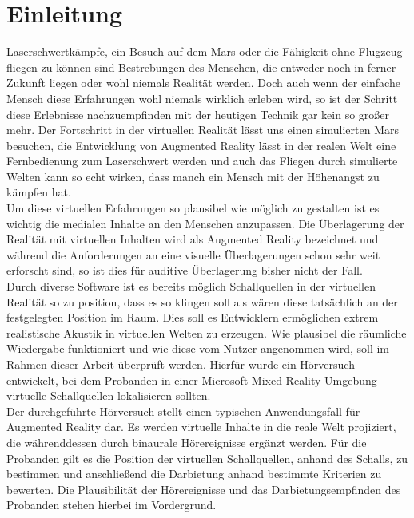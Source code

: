 \chapter{Einleitung}

Laserschwertkämpfe, ein Besuch auf dem Mars oder die Fähigkeit ohne Flugzeug fliegen zu können sind Bestrebungen des Menschen, die entweder noch in ferner Zukunft liegen oder wohl niemals Realität werden. Doch auch wenn der einfache Mensch diese Erfahrungen wohl niemals wirklich erleben wird, so ist der Schritt diese Erlebnisse nachzuempfinden mit der heutigen Technik gar kein so großer mehr. Der Fortschritt in der virtuellen Realität lässt uns einen simulierten Mars besuchen, die Entwicklung von Augmented Reality lässt in der realen Welt eine Fernbedienung zum Laserschwert werden und auch das Fliegen durch simulierte Welten kann so echt wirken, dass manch ein Mensch mit der Höhenangst zu kämpfen hat. \\

Um diese virtuellen Erfahrungen so plausibel wie möglich zu gestalten ist es wichtig die medialen Inhalte an den Menschen anzupassen. Die Überlagerung der Realität mit virtuellen Inhalten wird als Augmented Reality bezeichnet und während die Anforderungen an  eine visuelle Überlagerungen schon sehr weit erforscht sind, so ist dies für auditive Überlagerung bisher nicht der Fall. \\

Durch diverse Software ist es bereits möglich Schallquellen in der virtuellen Realität so zu position, dass es so klingen soll als wären diese tatsächlich an der festgelegten Position im Raum. Dies soll es Entwicklern ermöglichen extrem realistische Akustik in virtuellen Welten zu erzeugen. Wie plausibel die räumliche Wiedergabe funktioniert und wie diese vom Nutzer angenommen wird, soll im Rahmen dieser Arbeit überprüft werden. Hierfür wurde ein Hörversuch entwickelt, bei dem Probanden in einer Microsoft Mixed-Reality-Umgebung virtuelle Schallquellen lokalisieren sollten. \\

Der durchgeführte Hörversuch stellt einen typischen Anwendungsfall für Augmented Reality dar. Es werden virtuelle Inhalte in die reale Welt projiziert, die währenddessen durch binaurale Hörereignisse ergänzt werden. Für die Probanden gilt es die Position der virtuellen Schallquellen, anhand des Schalls, zu bestimmen und anschließend die Darbietung anhand bestimmte Kriterien zu bewerten. Die Plausibilität der Hörereignisse und das Darbietungsempfinden des Probanden stehen hierbei im Vordergrund.

